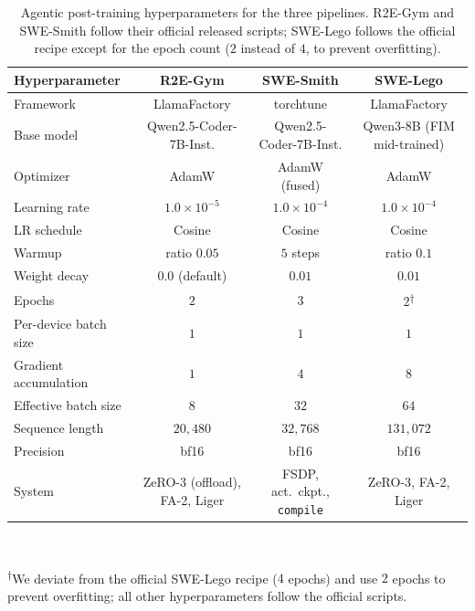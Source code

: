 \begin{table}[h]
\centering
\footnotesize
\caption{Agentic post-training hyperparameters for the three pipelines.
R2E-Gym and SWE-Smith follow their official released scripts; SWE-Lego
follows the official recipe except for the epoch count ($2$ instead of
$4$, to prevent overfitting).}
\label{tab:hp-posttrain}
\begin{tabular}{lccc}
\toprule
\textbf{Hyperparameter} & \textbf{R2E-Gym} & \textbf{SWE-Smith} & \textbf{SWE-Lego} \\
\midrule
Framework             & LlamaFactory & torchtune & LlamaFactory \\
Base model            & Qwen2.5-Coder-7B-Inst. & Qwen2.5-Coder-7B-Inst. & Qwen3-8B (FIM mid-trained) \\
Optimizer             & AdamW & AdamW (fused) & AdamW \\
Learning rate         & $1.0\!\times\!10^{-5}$ & $1.0\!\times\!10^{-4}$ & $1.0\!\times\!10^{-4}$ \\
LR schedule           & Cosine & Cosine & Cosine \\
Warmup                & ratio $0.05$ & $5$ steps & ratio $0.1$ \\
Weight decay          & $0.0$ (default) & $0.01$ & $0.01$ \\
Epochs                & $2$ & $3$ & $2$\textsuperscript{$\dagger$} \\
Per-device batch size & $1$ & $1$ & $1$ \\
Gradient accumulation & $1$ & $4$ & $8$ \\
Effective batch size  & $8$ & $32$ & $64$ \\
Sequence length       & $20{,}480$ & $32{,}768$ & $131{,}072$ \\
Precision             & bf16 & bf16 & bf16 \\
System                & ZeRO-3 (offload), FA-2, Liger & FSDP, act.\ ckpt., \texttt{compile} & ZeRO-3, FA-2, Liger \\
\bottomrule
\end{tabular}
\\[0.4em]
{\raggedright \footnotesize \textsuperscript{$\dagger$}We deviate from
the official SWE-Lego recipe ($4$ epochs) and use $2$ epochs to prevent
overfitting; all other hyperparameters follow the official scripts.\par}
\end{table}

